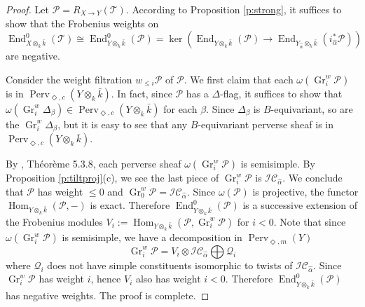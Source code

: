 \documentclass{amsart}
\theoremstyle{plain}
\theoremstyle{definition}
\theoremstyle{remark}
\numberwithin{equation}{subsection}
\begin{document}
\begin{proof}
Let ${\mathcal{P}}=R_{X\to Y}({\mathcal{T}})$. According to Proposition \ref{p:strong}, it suffices to show that the Frobenius weights on $\operatorname{End}^0_{{{X}\otimes_k\bar{k}}}({\mathcal{T}})\cong\operatorname{End}^0_{{{Y}\otimes_k\bar{k}}}({\mathcal{P}})=\ker(\operatorname{End}_{{{Y}\otimes_k\bar{k}}}({\mathcal{P}})\to\operatorname{End}_{{{Y_{\hat{\alpha}}}\otimes_k\bar{k}}}(i_{\hat\alpha}^*{\mathcal{P}}))$ are negative.

Consider the weight filtration $w_{\leq i}{\mathcal{P}}$ of ${\mathcal{P}}$. We first claim that each $\omega(\operatorname{Gr}^w_i{\mathcal{P}})$ is in ${\operatorname{Perv}_{\Diamond,c}({{{Y}}\otimes_k\bar{k}})}$. In fact, since ${\mathcal{P}}$ has a $\Delta$-flag, it suffices to show that $\omega(\operatorname{Gr}^w_i\Delta_\beta)\in{\operatorname{Perv}_{\Diamond,c}({{{Y}}\otimes_k\bar{k}})}$ for each $\beta$. Since $\Delta_\beta$ is $B$-equivariant, so are the $\operatorname{Gr}^w_i\Delta_\beta$, but it is easy to see that any $B$-equivariant perverse sheaf is in ${\operatorname{Perv}_{\Diamond,c}({{{Y}}\otimes_k\bar{k}})}$.

By \cite{BBD}, Th\'{e}or\`{e}me 5.3.8, each perverse sheaf $\omega(\operatorname{Gr}^w_i{\mathcal{P}})$ is semisimple. By Proposition \ref{p:tiltproj}(c), we see the last piece of $\operatorname{Gr}^w_i{\mathcal{P}}$ is ${\mathcal{IC}}_{\hat{\alpha}}$. We conclude that ${\mathcal{P}}$ has weight $\leq 0$ and $\operatorname{Gr}^w_0{\mathcal{P}}={\mathcal{IC}}_{\hat{\alpha}}$. Since $\omega({\mathcal{P}})$ is projective, the functor $\operatorname{Hom}_{{{Y}\otimes_k\bar{k}}}({\mathcal{P}},-)$ is exact. Therefore $\operatorname{End}^0_{{{Y}\otimes_k\bar{k}}}({\mathcal{P}})$ is a successive extension of the Frobenius modules $V_i:=\operatorname{Hom}_{{{Y}\otimes_k\bar{k}}}({\mathcal{P}},\operatorname{Gr}^w_i{\mathcal{P}})$ for $i<0$. Note that since $\omega(\operatorname{Gr}^w_i{\mathcal{P}})$ is semisimple, we have a decomposition in ${\operatorname{Perv}_{\Diamond,m}({Y})}$
\begin{equation}
\operatorname{Gr}^w_i{\mathcal{P}}=V_i\otimes{\mathcal{IC}}_{\hat{\alpha}}\bigoplus{\mathcal{Q}}_i
\end{equation}
where ${\mathcal{Q}}_i$ does not have simple constituents isomorphic to twists of ${\mathcal{IC}}_{\hat{\alpha}}$. Since $\operatorname{Gr}^w_i{\mathcal{P}}$ has weight $i$, hence $V_i$ also has weight $i<0$. Therefore $\operatorname{End}^0_{{{Y}\otimes_k\bar{k}}}({\mathcal{P}})$ has negative weights. The proof is complete.
\end{proof}
\end{document}
